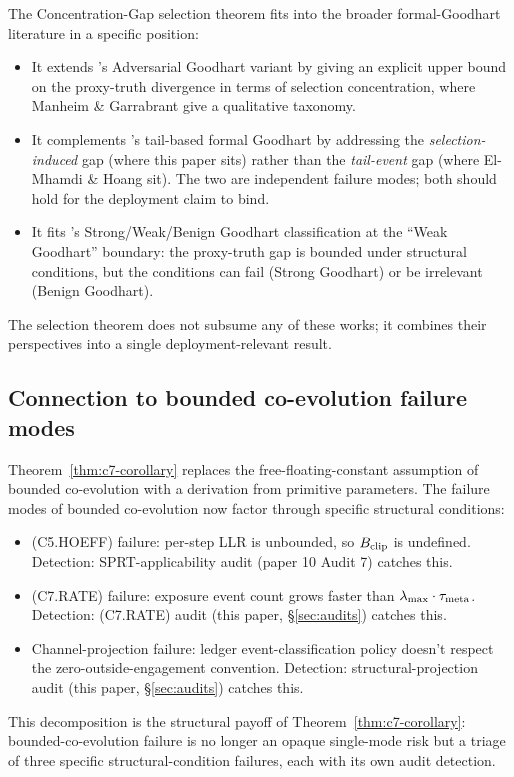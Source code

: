 The Concentration-Gap selection theorem fits into the broader
formal-Goodhart literature in a specific position:
\begin{itemize}
\item It extends \citep{manheim2019categorizing}'s Adversarial Goodhart
  variant by giving an explicit upper bound on the proxy-truth
  divergence in terms of selection concentration, where Manheim
  \& Garrabrant give a qualitative taxonomy.
\item It complements \citep{elmhamdi2024goodhart}'s tail-based
  formal Goodhart by addressing the \emph{selection-induced} gap
  (where this paper sits) rather than the \emph{tail-event}
  gap (where El-Mhamdi \& Hoang sit). The two are independent
  failure modes; both should hold for the deployment claim to
  bind.
\item It fits \citep{majka2025strong}'s Strong/Weak/Benign
  Goodhart classification at the ``Weak Goodhart'' boundary:
  the proxy-truth gap is bounded under structural conditions,
  but the conditions can fail (Strong Goodhart) or be irrelevant
  (Benign Goodhart).
\end{itemize}

The selection theorem does not subsume any of these works; it
combines their perspectives into a single deployment-relevant
result.

\subsection{Connection to bounded co-evolution failure modes}

Theorem~\ref{thm:c7-corollary} replaces the
free-floating-constant assumption of bounded co-evolution with a
derivation from primitive parameters. The failure modes of
bounded co-evolution now factor through specific structural
conditions:
\begin{itemize}
\item (C5.HOEFF) failure: per-step LLR is unbounded, so
  $B_{\mathrm{clip}}$ is undefined. Detection: SPRT-applicability audit
  (paper 10 Audit 7) catches this.
\item (C7.RATE) failure: exposure event count grows faster than
  $\lambda_{\max} \cdot \tau_{\mathrm{meta}}$. Detection: (C7.RATE) audit (this
  paper, \S\ref{sec:audits}) catches this.
\item Channel-projection failure: ledger event-classification
  policy doesn't respect the zero-outside-engagement convention.
  Detection: structural-projection audit (this paper,
  \S\ref{sec:audits}) catches this.
\end{itemize}

This decomposition is the structural payoff of
Theorem~\ref{thm:c7-corollary}: bounded-co-evolution failure is
no longer an opaque single-mode risk but a triage of three
specific structural-condition failures, each with its own audit
detection.

